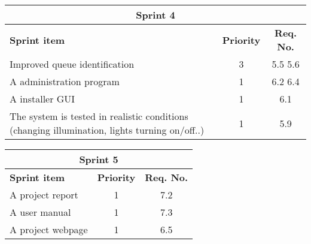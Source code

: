 \label{sprint4}
\begin{center}
	\begin{Large}
	\begin{tabular}{|p{10.5cm}|c|c|}
		\hline
		\multicolumn{3}{|c|}{\textbf{Sprint 4}} \\
		\hline
		\large{\textbf{Sprint item}} & \large{\textbf{Priority}} & \large{\textbf{Req. No.}} \\
		\hline
		\large{Improved queue identification} & \large{3} & 5.5 5.6 \\
		\hline
		\large{A administration program} & \large{1} & 6.2 6.4 \\
		\hline
		\large{A installer GUI} & \large{1} & 6.1 \\
		\hline
		\large{The system is tested in realistic conditions (changing illumination, lights turning on/off..)} & \large{1} & 5.9 \\
		\hline
	\end{tabular}
	\end{Large}
\end{center}



\label{sprint5}
\begin{center}
	\begin{Large}
	\begin{tabular}{|p{10.5cm}|c|c|}
		\hline
		\multicolumn{3}{|c|}{\textbf{Sprint 5}} \\
		\hline
		\large{\textbf{Sprint item}} & \large{\textbf{Priority}} & \large{\textbf{Req. No.}} \\
		\hline
		\large{A project report} & \large{1} & 7.2 \\
		\hline
		\large{A user manual} & \large{1} & 7.3 \\
		\hline
		\large{A project webpage} & \large{1} & 6.5 \\
		\hline
	\end{tabular}
	\end{Large}
\end{center}